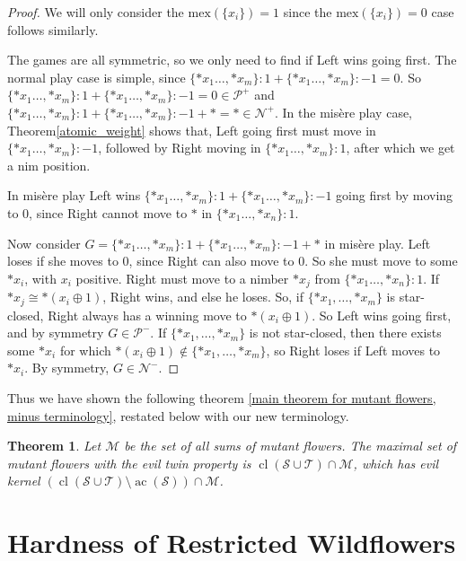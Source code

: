 \documentclass{amsart}
\theoremstyle{plain}
\newtheorem{thm}{Theorem}
\theoremstyle{definition}
\theoremstyle{remark}
\numberwithin{equation}{section}
\numberwithin{thm}{section}
\DeclareMathOperator{\cl}{cl}
\DeclareMathOperator{\ac}{ac}
\begin{document}
\begin{proof}
We will only consider the $\text{mex}(\{x_i\})=1$ since the $\text{mex}(\{x_i\})=0$ case follows similarly.
  
  The games are all symmetric, so we only need to find if Left wins going first. The normal play case is simple, since $\{*x_1\dots,*x_m\}:1 + \{*x_1\dots,*x_m\}:-1 = 0$. So $\{*x_1\dots,*x_m\}:1 + \{*x_1\dots,*x_m\}:-1 = 0 \in \mathcal{P}^+$ and  $\{*x_1\dots,*x_m\}:1 + \{*x_1\dots,*x_m\}:-1 + * = * \in \mathcal{N}^+$. In the mis\`ere play case, Theorem\ref{atomic_weight} shows that, Left going first must move in $\{*x_1\dots,*x_m\}:-1$, followed by Right moving in $\{*x_1\dots,*x_m\}:1$, after which we get a nim position.
  
In mis\`ere play  Left wins $ \{*x_1\dots,*x_m\}:1 + \{*x_1\dots,*x_m\}:-1$ going first by moving to $0$, since Right cannot move to $*$ in $ \{*x_1\dots,*x_n\}:1$.

  Now consider $G =\{*x_1\dots,*x_m\}:1 + \{*x_1\dots,*x_m\}:-1 +*$ in mis\`ere play. Left loses if she moves to $0$, since Right can also move to $0$. So she must move to some $*x_i$, with $x_i$ positive. Right must move to a nimber $*x_j$ from $ \{*x_1\dots,*x_n\}:1$. If $*x_j \cong *(x_i \oplus 1)$, Right wins, and else he loses. So, if $\{*x_1,\dots,*x_m\}$ is star-closed, Right always has a winning move to $*(x_i\oplus 1)$. So Left wins going first, and by symmetry $G \in \mathcal{P}^-$. If $\{*x_1,\dots,*x_m\}$ is not star-closed, then there exists some $*x_i$ for which $*(x_i \oplus 1) \notin \{*x_1 , \dots, *x_m \}$, so Right loses if Left moves to $*x_i$. By symmetry, $G \in \mathcal{N}^-$.
\end{proof}
Thus we have shown the following theorem \ref{main theorem for mutant flowers, minus terminology}, restated below with our new terminology.

\begin{thm}
    Let $\mathscr{M}$ be the set of all sums of mutant flowers. The maximal set of mutant flowers with the evil twin property is $\cl(\mathscr{S} \cup \mathscr{T}) \cap \mathscr{M}$, which has evil kernel $(\cl(\mathscr{S} \cup \mathscr{T}) \setminus \ac(\mathscr{S}) ) \cap \mathscr{M}$.
\end{thm}

\section{Hardness of Restricted Wildflowers}
\label{6}
\end{document}
